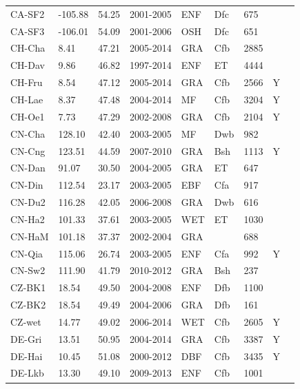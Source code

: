 \documentclass[gmd, manuscript]{copernicus}
\begin{document}
\begin{table}
\begin{tabular}{lllllllll}
  CA-SF2 & -105.88 & 54.25 & 2001-2005 & ENF & Dfc & 675 &  & \citet{CA-SF2} \\ 
  CA-SF3 & -106.01 & 54.09 & 2001-2006 & OSH & Dfc & 651 &  & \citet{CA-SF3} \\ 
  CH-Cha & 8.41 & 47.21 & 2005-2014 & GRA & Cfb & 2885 &  & \citet{CH-Cha} \\ 
  CH-Dav & 9.86 & 46.82 & 1997-2014 & ENF & ET & 4444 &  & \citet{CH-Dav} \\ 
  CH-Fru & 8.54 & 47.12 & 2005-2014 & GRA & Cfb & 2566 & Y & \citet{CH-Fru} \\ 
  CH-Lae & 8.37 & 47.48 & 2004-2014 & MF & Cfb & 3204 & Y & \citet{CH-Lae} \\ 
  CH-Oe1 & 7.73 & 47.29 & 2002-2008 & GRA & Cfb & 2104 & Y & \citet{CH-Oe1} \\ 
  CN-Cha & 128.10 & 42.40 & 2003-2005 & MF & Dwb & 982 &  & \citet{CN-Cha} \\ 
  CN-Cng & 123.51 & 44.59 & 2007-2010 & GRA & Bsh & 1113 & Y & \citet{CN-Cng} \\ 
  CN-Dan & 91.07 & 30.50 & 2004-2005 & GRA & ET & 647 &  & \citet{CN-Dan} \\ 
  CN-Din & 112.54 & 23.17 & 2003-2005 & EBF & Cfa & 917 &  & \citet{CN-Din} \\ 
  CN-Du2 & 116.28 & 42.05 & 2006-2008 & GRA & Dwb & 616 &  & \citet{CN-Du2} \\ 
  CN-Ha2 & 101.33 & 37.61 & 2003-2005 & WET & ET & 1030 &  & \citet{CN-Ha2} \\ 
  CN-HaM & 101.18 & 37.37 & 2002-2004 & GRA &  & 688 &  & \citet{CN-HaM} \\ 
  CN-Qia & 115.06 & 26.74 & 2003-2005 & ENF & Cfa & 992 & Y & \citet{CN-Qia} \\ 
  CN-Sw2 & 111.90 & 41.79 & 2010-2012 & GRA & Bsh & 237 &  & \citet{CN-Sw2} \\ 
  CZ-BK1 & 18.54 & 49.50 & 2004-2008 & ENF & Dfb & 1100 &  & \citet{CZ-BK1} \\ 
  CZ-BK2 & 18.54 & 49.49 & 2004-2006 & GRA & Dfb & 161 &  & \citet{CZ-BK2} \\ 
  CZ-wet & 14.77 & 49.02 & 2006-2014 & WET & Cfb & 2605 & Y & \citet{CZ-wet} \\ 
  DE-Gri & 13.51 & 50.95 & 2004-2014 & GRA & Cfb & 3387 & Y & \citet{DE-Gri} \\ 
  DE-Hai & 10.45 & 51.08 & 2000-2012 & DBF & Cfb & 3435 & Y & \citet{DE-Hai} \\ 
  DE-Lkb & 13.30 & 49.10 & 2009-2013 & ENF & Cfb & 1001 &  & \citet{DE-Lkb} \\ 

\end{tabular}
\end{table}
\end{document}
